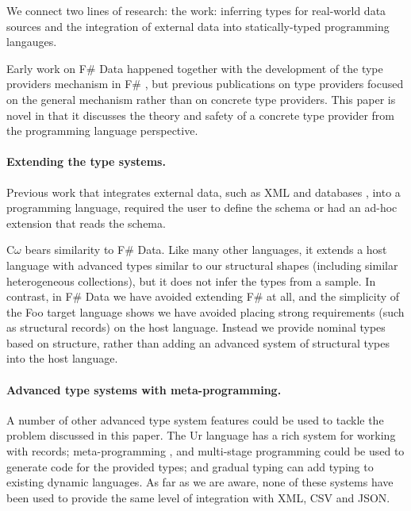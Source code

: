\documentclass[10pt,preprint,clearpagebib]{sigplanconf}
\begin{document}
We connect two lines of research: the work: inferring types for real-world data sources
and the integration of external data into statically-typed programming langauges.

Early work on F\# Data happened together with the development of the type providers mechanism in F\# 
\cite{fsharp-typeprov,fsharp-typeprov-ddfp}, but previous publications on type providers focused on 
the general mechanism \cite{idris-tp,liteq} rather than on concrete type providers. This paper 
is novel in that it discusses the theory and safety of a concrete type provider from the programming
language perspective. 

\paragraph{Extending the type systems.} 
Previous work that integrates external data, such as XML \cite{xduce,xduce-ml} and databases 
\cite{links,linq}, into a programming language, required the user to define the schema
or had an ad-hoc extension that reads the schema.

C$\omega$ \cite{comega-xs} bears similarity to F\# Data. Like many other
languages, it extends a host language with advanced types similar to our
structural shapes (including similar heterogeneous collections), but it 
does not infer the types from a sample. In contrast, in F\# Data 
we have avoided extending F\# at all, and the simplicity of the Foo 
target language shows we have avoided placing strong requirements 
(such as structural records) on the host language. Instead we provide nominal 
types based on structure, rather than adding an advanced
system of structural types into the host language.

\paragraph{Advanced type systems with meta-programming.}
A number of other advanced type system features could be used to tackle the problem discussed 
in this paper. The Ur \cite{ur} language has a rich system for working with records; 
meta-programming \cite{template-hask}, \cite{th-camlp4} and multi-stage programming \cite{multi-stage}
could be used to generate code for the provided types; and gradual typing \cite{gradual,gradual-js} 
can add typing to existing dynamic languages. As far as we are aware, none of these 
systems have been used to provide the same level of integration with XML, CSV and JSON.
\end{document}
